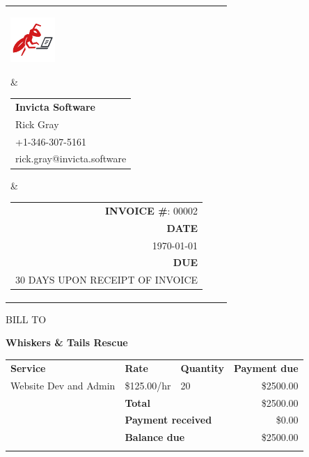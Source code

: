 \documentclass{letter}
\begin{document}
\begin{tabularx}{\textwidth}{@{} l X r @{}}
    \parbox[t]{1.7cm}{\vspace{-9pt}\includegraphics[height=1.7cm]{logo.png}}
    &

    \begin{tabular}[t]{@{}l@{}}
        \textbf{Invicta Software} \\
        Rick Gray                 \\
        +1-346-307-5161           \\
        rick.gray@invicta.software
    \end{tabular}
    &

    \begin{tabular}[t]{@{}r@{}}
                 \footnotesize \textbf{INVOICE \#}: 00002 \\
        [-0.6ex] \footnotesize \textbf{DATE}              \\
        [-0.6ex] \footnotesize \MakeUppercase{\today}     \\
        [-0.6ex] \footnotesize \textbf{DUE}               \\
        [-0.6ex] \footnotesize 30 DAYS UPON RECEIPT OF INVOICE
    \end{tabular}
\end{tabularx}

\vspace{1cm}

BILL TO

\Large\textbf{Whiskers \& Tails Rescue}\normalsize

\begin{tabularx}{\linewidth}{p{8.5cm} X X r}
    \hhline{----}
    \rule{0pt}{5ex} \bf{Service}          & \bf{Rate}                                & \bf{Quantity} & \bf Payment due \\
    \hhline{----}
    \rule{0pt}{5ex} Website Dev and Admin & \$125.00/hr                              & 20            & \$2500.00       \\
    \hhline{----}
    \rule{0pt}{5ex}                       & \multicolumn{2}{l}{\bf Total}                            & \$2500.00       \\
    \hhline{~---}
    \rule{0pt}{5ex}                       & \multicolumn{2}{l}{\bf Payment received}                 & \$0.00          \\
    \hhline{~---}
    \rule{0pt}{5ex}                       & \multicolumn{2}{l}{\bf Balance due}                      & \$2500.00       \\
    \hhline{~===}
\end{tabularx}
\end{document}

